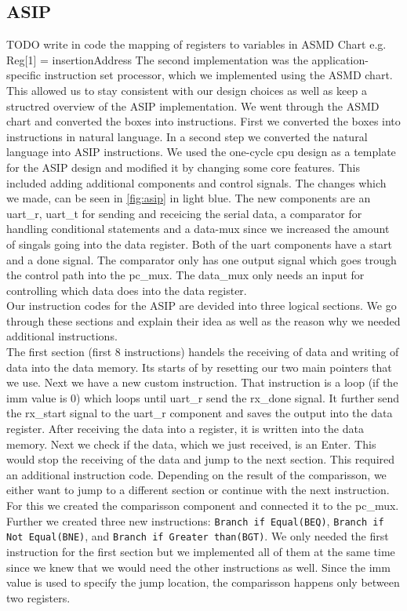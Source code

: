 \documentclass[conference]{IEEEtran}
\begin{document}
\subsection{ASIP}
TODO write in code the mapping of registers to variables in ASMD Chart e.g. Reg[1] = insertionAddress
The second implementation was the application-specific instruction set processor, which we implemented using the ASMD chart. This allowed us to stay consistent with our design choices as well as keep a structred overview of the ASIP implementation. We went through the ASMD chart and converted the boxes into instructions. First we converted the boxes into instructions in natural language. In a second step we converted the natural language into ASIP instructions. We used the one-cycle cpu design as a template for the ASIP design and modified it by changing some core features. This included adding additional components and control signals. The changes which we made, can be seen in \autoref{fig:asip} in light blue. The new components are an uart\_r, uart\_t for sending and receicing the serial data, a comparator for handling conditional statements and a data-mux since we increased the amount of singals going into the data register. Both of the uart components have a start and a done signal. The comparator only has one output signal which goes trough the control path into the pc\_mux. The data\_mux only needs an input for controlling which data does into the data register.\\
Our instruction codes for the ASIP are devided into three logical sections. We go through these sections and explain their idea as well as the reason why we needed additional instructions.\\
The first section (first 8 instructions) handels the receiving of data and writing of data into the data memory. Its starts of by resetting our two main pointers that we use. Next we have a new custom instruction. That instruction is a loop (if the imm value is 0) which loops until uart\_r send the rx\_done signal. It further send the rx\_start signal to the uart\_r component and saves the output into the data register. After receiving the data into a register, it is written into the data memory. Next we check if the data, which we just received, is an Enter. This would stop the receiving of the data and jump to the next section. This required an additional instruction code. Depending on the result of the comparisson, we either want to jump to a different section or continue with the next instruction. For this we created the comparisson component and connected it to the pc\_mux. Further we created three new instructions: \texttt{Branch if Equal(BEQ)}, \texttt{Branch if Not Equal(BNE)}, and \texttt{Branch if Greater than(BGT)}. We only needed the first instruction for the first section but we implemented all of them at the same time since we knew that we would need the other instructions as well. Since the imm value is used to specify the jump location, the comparisson happens only between two registers.\\
\end{document}
